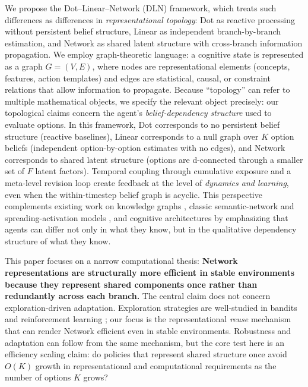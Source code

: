 \documentclass[11pt]{article}
\begin{document}
We propose the Dot--Linear--Network (DLN) framework, which treats such differences as differences in \emph{representational topology}: Dot as reactive processing without persistent belief structure, Linear as independent branch-by-branch estimation, and Network as shared latent structure with cross-branch information propagation. We employ graph-theoretic language: a cognitive state is represented as a graph $G=(V,E)$, where nodes are representational elements (concepts, features, action templates) and edges are statistical, causal, or constraint relations that allow information to propagate. Because ``topology'' can refer to multiple mathematical objects, we specify the relevant object precisely: our topological claims concern the agent's \emph{belief-dependency structure} used to evaluate options. In this framework, Dot corresponds to no persistent belief structure (reactive baselines), Linear corresponds to a null graph over $K$ option beliefs (independent option-by-option estimates with no edges), and Network corresponds to shared latent structure (options are d-connected through a smaller set of $F$ latent factors). Temporal coupling through cumulative exposure and a meta-level revision loop create feedback at the level of \emph{dynamics and learning}, even when the within-timestep belief graph is acyclic. This perspective complements existing work on knowledge graphs \cite{Hogan2021}, classic semantic-network and spreading-activation models \cite{CollinsLoftus1975,Anderson1983}, and cognitive architectures \cite{ACTR2004,Laird2012} by emphasizing that agents can differ not only in what they know, but in the qualitative dependency structure of what they know.

This paper focuses on a narrow computational thesis: \textbf{Network representations are structurally more efficient in stable environments because they represent shared components once rather than redundantly across each branch.} The central claim does not concern exploration-driven adaptation. Exploration strategies are well-studied in bandits and reinforcement learning \cite{Gershman2018,RussoBandits2018,SuttonBarto2018}; our focus is the representational \emph{reuse} mechanism that can render Network efficient even in stable environments. Robustness and adaptation can follow from the same mechanism, but the core test here is an efficiency scaling claim: do policies that represent shared structure once avoid $O(K)$ growth in representational and computational requirements as the number of options $K$ grows?
\end{document}
